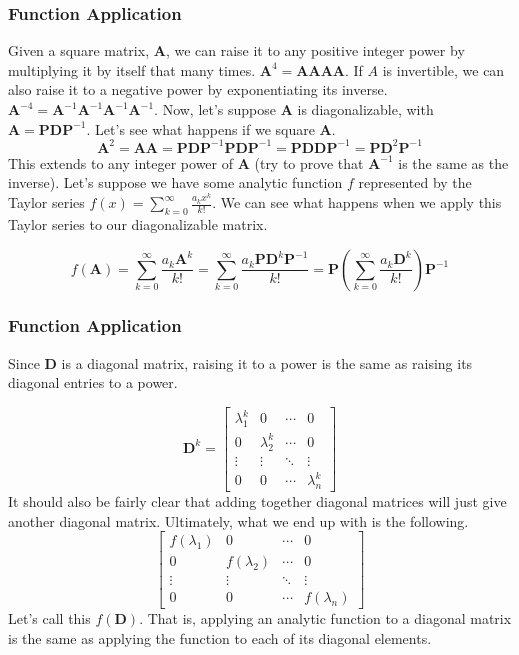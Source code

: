 \documentclass[10pt]{beamer}
\begin{document}
\begin{frame}
  \frametitle{Function Application}
  Given a square matrix, $\mathbf{A}$, we can raise it to any positive integer power by multiplying it by itself that many times. $\mathbf{A}^4 = \mathbf{AAAA}$. If $A$ is invertible, we can also raise it to a negative power by exponentiating its inverse. $\mathbf{A}^{-4} = \mathbf{A}^{-1}\mathbf{A}^{-1}\mathbf{A}^{-1}\mathbf{A}^{-1}$. Now, let's suppose $\mathbf{A}$ is diagonalizable, with $\mathbf{A} = \mathbf{PDP}^{-1}$. Let's see what happens if we square $\mathbf{A}$.
  $$\mathbf{A}^2 = \mathbf{AA} = \mathbf{PDP}^{-1}\mathbf{PDP}^{-1} = \mathbf{PDDP}^{-1} = \mathbf{PD}^2\mathbf{P}^{-1}$$
  This extends to any integer power of $\mathbf{A}$ (try to prove that $\mathbf{A}^{-1}$ is the same as the inverse). Let's suppose we have some analytic function $f$ represented by the Taylor series $f(x) = \sum_{k = 0}^{\infty} \frac{a_kx^k}{k!}$. We can see what happens when we apply this Taylor series to our diagonalizable matrix.

  $$f(\mathbf{A}) = \sum_{k = 0}^{\infty} \frac{a_k\mathbf{A}^k}{k!} = \sum_{k = 0}^\infty \frac{a_k\mathbf{PD}^k\mathbf{P}^{-1}}{k!} = \mathbf{P}\left(\sum_{k = 0}^\infty\frac{a_k\mathbf{D}^k}{k!}\right)\mathbf{P}^{-1}$$
\end{frame}
\begin{frame}
  \frametitle{Function Application}
  Since $\mathbf{D}$ is a diagonal matrix, raising it to a power is the same as raising its diagonal entries to a power.

  $$\mathbf{D}^k = \left[\begin{matrix}
      \lambda_1^k & 0 & \cdots & 0\\
      0 & \lambda_2^k & \cdots & 0\\
      \vdots & \vdots & \ddots & \vdots\\
      0 & 0 & \cdots & \lambda_n^k
    \end{matrix}\right]$$
  It should also be fairly clear that adding together diagonal matrices will just give another diagonal matrix. Ultimately, what we end up with is the following.
  $$\left[\begin{matrix}
      f(\lambda_1) & 0 & \cdots & 0\\
      0 & f(\lambda_2) & \cdots & 0\\
      \vdots & \vdots & \ddots & \vdots\\
      0 & 0 & \cdots & f(\lambda_n)
    \end{matrix}\right]$$
  Let's call this $f(\mathbf{D})$. That is, applying an analytic function to a diagonal matrix is the same as applying the function to each of its diagonal elements.
\end{frame}
\end{document}
